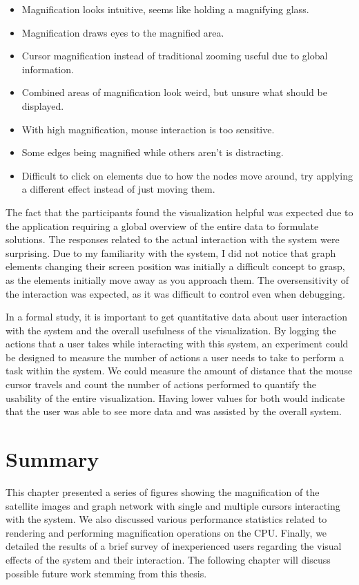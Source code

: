 \begin{itemize}
    \item Magnification looks intuitive, seems like holding a magnifying glass.
    \item Magnification draws eyes to the magnified area.
    \item Cursor magnification instead of traditional zooming useful due to global information.

    \item Combined areas of magnification look weird, but unsure what should be displayed.

    \item With high magnification, mouse interaction is too sensitive.
    \item Some edges being magnified while others aren't is distracting.
    \item Difficult to click on elements due to how the nodes move around, try applying a different effect instead of just moving them.
\end{itemize}

The fact that the participants found the visualization helpful was expected due to the application requiring a global overview of the entire data to formulate solutions. The responses related to the actual interaction with the system were surprising. Due to my familiarity with the system, I did not notice that graph elements changing their screen position was initially a difficult concept to grasp, as the elements initially move away as you approach them. The oversensitivity of the interaction was expected, as it was difficult to control even when debugging.

In a formal study, it is  important to get quantitative data about user interaction with the system and the overall usefulness of the visualization. By logging the actions that a user takes while interacting with this system, an experiment could be designed to measure the number of actions a user needs to take to perform a task within the system. We could measure the amount of distance that the
mouse cursor travels and count the number of actions performed to quantify the usability of the entire visualization. Having lower values for both would indicate that the user was able to see more data and was assisted by the overall system. 

\section{Summary}
\label{section:results_summary}

This chapter presented a series of figures showing the magnification of the satellite images and graph network with single and multiple cursors interacting with the system. We also discussed various performance statistics related to rendering and performing magnification operations on the CPU\@. Finally, we detailed the results of a brief survey of inexperienced users regarding the visual effects of the system and their interaction. The following chapter will discuss possible future
work stemming from this thesis.

